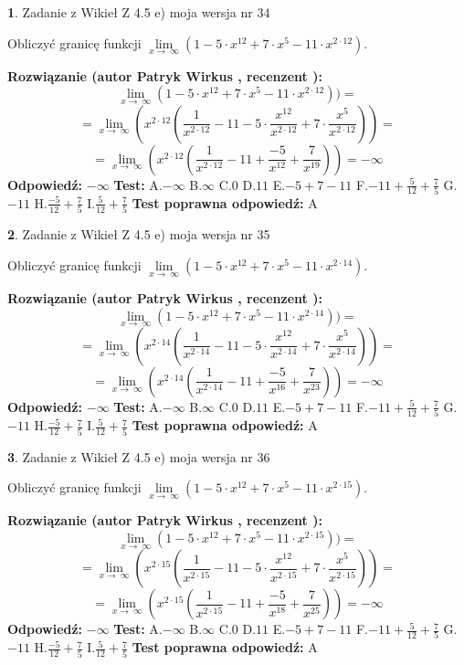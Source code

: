 \documentclass[12pt, a4paper]{article}
\theoremstyle{definition} %
\newtheorem{zad}{}
\newcommand{\zadStart}[1]{\begin{zad}#1\newline}
\newcommand{\zadStop}{\end{zad}}
\newcommand{\rozwStart}[2]{\noindent \textbf{Rozwiązanie (autor #1 , recenzent #2): }\newline}
\newcommand{\rozwStop}{\newline}
\newcommand{\odpStart}{\noindent \textbf{Odpowiedź:}\newline}
\newcommand{\odpStop}{\newline}
\newcommand{\testStart}{\noindent \textbf{Test:}\newline}
\newcommand{\testStop}{\newline}
\newcommand{\kluczStart}{\noindent \textbf{Test poprawna odpowiedź:}\newline}
\newcommand{\kluczStop}{\newline}
\begin{document}
\zadStart{Zadanie z Wikieł Z 4.5 e) moja wersja nr 34}



Obliczyć granicę funkcji  $\lim\limits_{x\to\ \infty}(1 - 5 \cdot x^{12}+7 \cdot x^{5}- 11 \cdot x^{2\cdot12})$.
\zadStop
\rozwStart{Patryk Wirkus}{}
$$\lim\limits_{x\to\ \infty}(1 - 5 \cdot x^{12}+7 \cdot x^{5}- 11 \cdot x^{2\cdot12}))=$$
$$=\lim\limits_{x\to\ \infty}(x^{2\cdot12}(\frac{1}{x^{2\cdot12}}-11 -5 \cdot \frac{x^{12}}{x^{2\cdot12}}+7 \cdot \frac{x^{5}}{x^{2\cdot12}}))=$$
$$=\lim\limits_{x\to\ \infty}(x^{2\cdot12}(\frac{1}{x^{2\cdot12}}-11 + \frac{-5}{x^{12}}+ \frac{7}{x^{19}}))=-\infty$$
\rozwStop
\odpStart
$-\infty$
\odpStop
\testStart
A.$-\infty$ B.$\infty$ C.$0$ D.$11$ E.$-5 + 7 - 11$
F.$-11+\frac{5}{12}+\frac{7}{5}$ G.$-11$
H.$\frac{-5}{12}+\frac{7}{5}$
I.$\frac{5}{12}+\frac{7}{5}$
\testStop
\kluczStart
A
\kluczStop



\zadStart{Zadanie z Wikieł Z 4.5 e) moja wersja nr 35}



Obliczyć granicę funkcji  $\lim\limits_{x\to\ \infty}(1 - 5 \cdot x^{12}+7 \cdot x^{5}- 11 \cdot x^{2\cdot14})$.
\zadStop
\rozwStart{Patryk Wirkus}{}
$$\lim\limits_{x\to\ \infty}(1 - 5 \cdot x^{12}+7 \cdot x^{5}- 11 \cdot x^{2\cdot14}))=$$
$$=\lim\limits_{x\to\ \infty}(x^{2\cdot14}(\frac{1}{x^{2\cdot14}}-11 -5 \cdot \frac{x^{12}}{x^{2\cdot14}}+7 \cdot \frac{x^{5}}{x^{2\cdot14}}))=$$
$$=\lim\limits_{x\to\ \infty}(x^{2\cdot14}(\frac{1}{x^{2\cdot14}}-11 + \frac{-5}{x^{16}}+ \frac{7}{x^{23}}))=-\infty$$
\rozwStop
\odpStart
$-\infty$
\odpStop
\testStart
A.$-\infty$ B.$\infty$ C.$0$ D.$11$ E.$-5 + 7 - 11$
F.$-11+\frac{5}{12}+\frac{7}{5}$ G.$-11$
H.$\frac{-5}{12}+\frac{7}{5}$
I.$\frac{5}{12}+\frac{7}{5}$
\testStop
\kluczStart
A
\kluczStop



\zadStart{Zadanie z Wikieł Z 4.5 e) moja wersja nr 36}



Obliczyć granicę funkcji  $\lim\limits_{x\to\ \infty}(1 - 5 \cdot x^{12}+7 \cdot x^{5}- 11 \cdot x^{2\cdot15})$.
\zadStop
\rozwStart{Patryk Wirkus}{}
$$\lim\limits_{x\to\ \infty}(1 - 5 \cdot x^{12}+7 \cdot x^{5}- 11 \cdot x^{2\cdot15}))=$$
$$=\lim\limits_{x\to\ \infty}(x^{2\cdot15}(\frac{1}{x^{2\cdot15}}-11 -5 \cdot \frac{x^{12}}{x^{2\cdot15}}+7 \cdot \frac{x^{5}}{x^{2\cdot15}}))=$$
$$=\lim\limits_{x\to\ \infty}(x^{2\cdot15}(\frac{1}{x^{2\cdot15}}-11 + \frac{-5}{x^{18}}+ \frac{7}{x^{25}}))=-\infty$$
\rozwStop
\odpStart
$-\infty$
\odpStop
\testStart
A.$-\infty$ B.$\infty$ C.$0$ D.$11$ E.$-5 + 7 - 11$
F.$-11+\frac{5}{12}+\frac{7}{5}$ G.$-11$
H.$\frac{-5}{12}+\frac{7}{5}$
I.$\frac{5}{12}+\frac{7}{5}$
\testStop
\kluczStart
A
\kluczStop
\end{document}
